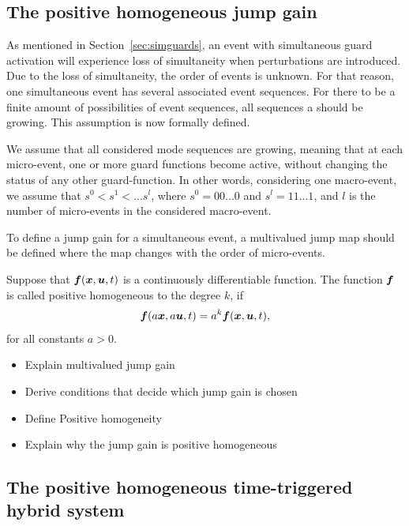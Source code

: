 \documentclass[../DC2017114Bouma.tex]{subfiles}
\begin{document}
\subsection{The positive homogeneous jump gain}
As mentioned in Section~\ref{sec:simguards}, an event with simultaneous guard activation will experience loss of simultaneity when perturbations are introduced. Due to the loss of simultaneity, the order of events is unknown. For that reason, one simultaneous event has several associated event sequences. For there to be a finite amount of possibilities of event sequences, all sequences a should be growing. This assumption is now formally defined.

\begin{myass}
We assume that all considered mode sequences are growing, meaning that at each micro-event, one or more guard functions become active, without changing the status of any other guard-function. In other words, considering one macro-event, we assume that $s^0<s^1<...s^l$, where $s^0= 00...0$ and $s^l = 11...1$, and $l$ is the number of micro-events in the considered macro-event.
\end{myass}

To define a jump gain for a simultaneous event, a multivalued jump map should be defined where the map changes with the order of micro-events.

\begin{mydef}
Suppose that ${\boldsymbol{f}}({\boldsymbol{x}},{\boldsymbol{u}},t)$ is a continuously differentiable function. The function ${\boldsymbol{f}}$ is called positive homogeneous to the degree $k$, if 
\begin{align}
{\boldsymbol{f}}(a{\boldsymbol{x}},a{\boldsymbol{u}},t) = a^k{\boldsymbol{f}}({\boldsymbol{x}},{\boldsymbol{u}},t),
\end{align}
for all constants $a>0$.
\end{mydef}

\begin{itemize}
\item Explain multivalued jump gain
\item Derive conditions that decide which jump gain is chosen
\item Define Positive homogeneity
\item Explain why the jump gain is positive homogeneous
\end{itemize}
\subsection{The positive homogeneous time-triggered hybrid system}
\end{document}
